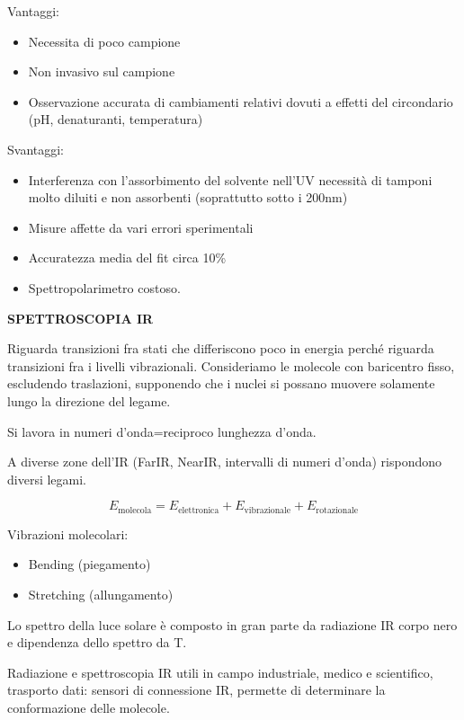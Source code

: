 Vantaggi:

\begin{itemize}
\item
  Necessita di poco campione
\item
  Non invasivo sul campione
\item
  Osservazione accurata di cambiamenti relativi dovuti a effetti del
  circondario (pH, denaturanti, temperatura)
\end{itemize}

Svantaggi:

\begin{itemize}
\item
  Interferenza con l'assorbimento del solvente nell'UV necessità di
  tamponi molto diluiti e non assorbenti (soprattutto sotto i 200nm)
\item
  Misure affette da vari errori sperimentali
\item
  Accuratezza media del fit circa 10\%
\item
  Spettropolarimetro costoso.
\end{itemize}

\textbf{SPETTROSCOPIA IR}

Riguarda transizioni fra stati che differiscono poco in energia perché
riguarda transizioni fra i livelli vibrazionali. Consideriamo le
molecole con baricentro fisso, escludendo traslazioni, supponendo che i
nuclei si possano muovere solamente lungo la direzione del legame.

Si lavora in numeri d'onda=reciproco lunghezza d'onda.

A diverse zone dell'IR (FarIR, NearIR, intervalli di numeri d'onda)
rispondono diversi legami.

\[E_{\text{molecola}} = E_{\text{elettronica}} + E_{\text{vibrazionale}} + E_{\text{rotazionale}}\]

Vibrazioni molecolari:

\begin{itemize}
\item
  Bending (piegamento)
\item
  Stretching (allungamento)
\end{itemize}

Lo spettro della luce solare è composto in gran parte da radiazione IR
corpo nero e dipendenza dello spettro da T.

Radiazione e spettroscopia IR utili in campo industriale, medico e
scientifico, trasporto dati: sensori di connessione IR, permette di
determinare la conformazione delle molecole.

